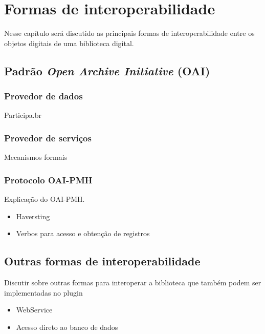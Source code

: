 \chapter{Formas de interoperabilidade}
\label{cap:sociedadepsocial}

Nesse capítulo será discutido as principais formas de interoperabilidade entre os objetos digitais de uma biblioteca digital.

\section{Padrão \textit{Open Archive Initiative} (OAI)}
\label{sec:mecformalpart}

\subsection{Provedor de dados}

Participa.br

\subsection{Provedor de serviços}

Mecanismos formais

\subsection{Protocolo OAI-PMH}

Explicação do OAI-PMH.

\begin{itemize}
	\item Haversting
	\item Verbos para acesso e obtenção de registros
\end{itemize}

\section{Outras formas de interoperabilidade}

Discutir sobre outras formas para interoperar a biblioteca que também podem ser implementadas no plugin

\begin{itemize}
	\item WebService
	\item Acesso direto ao banco de dados
\end{itemize}


